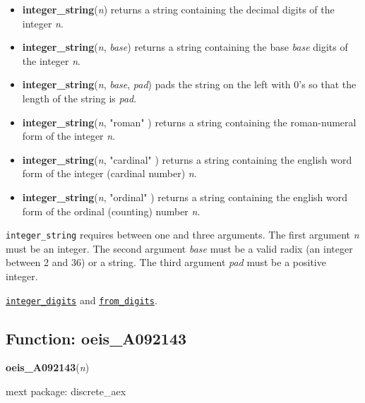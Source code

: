 \documentclass[]{article}
\begin{document}
\vspace{5 pt}
\begin{itemize}
\item[] {\bf integer\_string}({\it n})
  returns a string containing the decimal digits of the integer {\it n}. 

\item[] {\bf integer\_string}({\it n}, {\it base})
  returns a string containing the base {\it base} digits of the integer {\it n}. 

\item[] {\bf integer\_string}({\it n}, {\it base}, {\it pad})
  pads the string on the left with 0's so that the length of the string is {\it pad}. 

\item[] {\bf integer\_string}({\it n}, "roman" )
  returns a string containing the roman-numeral form of the integer {\it n}. 

\item[] {\bf integer\_string}({\it n}, "cardinal" )
  returns a string containing the english word form of the integer (cardinal number) {\it n}. 

\item[] {\bf integer\_string}({\it n}, "ordinal" )
  returns a string containing the english word form of the ordinal (counting) number {\it n}. 

\end{itemize}
   {\tt integer\_string} requires between one and three arguments.
    The first argument {\it n} must be an integer.
    The second argument {\it base} must be a valid radix (an integer between 2 and 36) or a string.
    The third argument {\it pad} must be a positive integer.


\vspace{5 pt}


 \hyperlink{integer_digits}{{\tt integer\_digits}} and \hyperlink{from_digits}{{\tt from\_digits}}.

\vspace{5 pt}


\subsection{Function: oeis\_A092143\label{sec:oeis_A092143}}
\hypertarget{oeis_A092143}{}
{\bf oeis\_A092143}({\it n})


\noindent mext package: discrete\_aex
\end{document}
